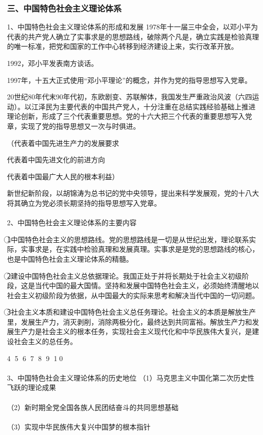 \documentclass{ctexart}
\begin{document}
\subsubsection{三、中国特色社会主义理论体系}
1、中国特色社会主义理论体系的形成和发展
1978年十一届三中全会，以邓小平为代表的共产党人确立了实事求是的思想路线，破除两个凡是，确立实践是检验真理的唯一标准，把党和国家的工作中心转移到经济建设上来，实行改革开放。

1992，邓小平发表南方谈话。

1997年，十五大正式使用“邓小平理论”的概念，并作为党的指导思想写入党章。

20世纪80年代末90年代初，东欧剧变、苏联解体，我国发生严重政治风波（六四运动）。以江泽民为主要代表的中国共产党人，十分注重在总结实践经验基础上推进理论创新，形成了三个代表重要思想。党的十六大把三个代表的重要思想写入党章，实现了党的指导思想又一次与时俱进。

（代表着中国先进生产力的发展要求

代表着中国先进文化的前进方向

代表着中国最广大人民的根本利益）

新世纪新阶段，以胡锦涛为总书记的党中央领导，提出来科学发展观，党的十八大将其确立为党必须长期坚持的指导思想写入党章。
\\\\

2、中国特色社会主义理论体系的主要内容

\textcircled{1}中国特色社会主义的思想路线。党的思想路线是一切是从世纪出发，理论联系实际，实事求是，在实践中检验真理和发展真理。实事求是是党的思想路线的核心，也是中国特色社会主义理论体系的精髓。

\textcircled{2}建设中国特色社会主义总依据理论。我国正处于并将长期处于社会主义初级阶段，这是当代中国的最大国情。坚持和发展中国特色社会主义，必须始终清醒地以社会主义初级阶段为依据，从中国最大的实际来思考和解决当代中国的一切问题。

\textcircled{3}社会主义本质和建设中国特色社会主义总任务理论。社会主义的本质是解放生产里，发展生产力，消灭剥削，消除两极分化，最终达到共同富裕。解放生产力和发展生产力是社会主义的根本任务，实现社会主义现代化和中华民族伟大复兴，是建设社会主义的总任务。

\textcircled{4}
\textcircled{5}
\textcircled{6}
\textcircled{7}
\textcircled{8}
\textcircled{9}
\textcircled{10}
\\\\

3、中国特色社会主义理论体系的历史地位
（1）马克思主义中国化第二次历史性飞跃的理论成果
\\\\
（2）新时期全党全国各族人民团结奋斗的共同思想基础
\\\\
（3）实现中华民族伟大复兴中国梦的根本指针
\end{document}
